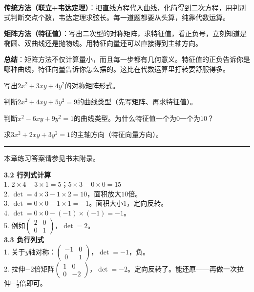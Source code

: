 \documentclass[a4paper,12pt]{ctexart}
\begin{document}

\textbf{传统方法（联立+韦达定理）}：把直线方程代入曲线，化简得到二次方程，用判别式判断交点个数，韦达定理求弦长。每一道题都要从头算，纯靠代数运算。

\textbf{矩阵方法（特征值）}：写出二次型的对称矩阵，求特征值，看正负号，立刻知道是椭圆、双曲线还是抛物线。用特征向量还可以直接得到主轴方向。

\textbf{总结}：矩阵方法不仅计算量小，而且每一步都有几何意义。特征值的正负告诉你是哪种曲线，特征向量告诉你怎么摆的。这比在代数运算里打转要舒服得多。

\begin{exercise}[二次型练习]
\item 写出$2x^2+3xy+4y^2$的对称矩阵形式。
\item 判断$2x^2+4xy+5y^2=9$的曲线类型（先写矩阵、再求特征值）。
\item 判断$x^2-6xy+9y^2=1$的曲线类型。为什么特征值一个为$0$一个为$10$？
\item 求$3x^2+2xy+3y^2=1$的主轴方向（特征向量方向）。
\end{exercise}

\vfill
\noindent\rule{\textwidth}{0.4pt}
本章练习答案请参见书末附录。

\newpage



\noindent\textbf{3.2 行列式计算}\\
1. $2\times4-3\times1=5$；$5\times3-0\times0=15$\\
2. $\det=4\times3-1\times2=10$，面积放大$10$倍。\\
3. $\det=0\times0-1\times1=-1$。面积大小$1$，定向反转。\\
4. $\det=0\times0-(-1)\times(-1)=-1$。\\
5. 例如$\begin{pmatrix}2&0\\0&1\end{pmatrix}$，$\det=2$。\\

\noindent\textbf{3.3 负行列式}\\
1. 关于$y$轴对称：$\begin{pmatrix}-1&0\\0&1\end{pmatrix}$，$\det=-1$，负。\\
2. 拉伸$-2$倍矩阵$\begin{pmatrix}1&0\\0&-2\end{pmatrix}$，$\det=-2$。定向反转了。能还原——再做一次拉伸$-\frac12$倍即可。\\
\end{document}
